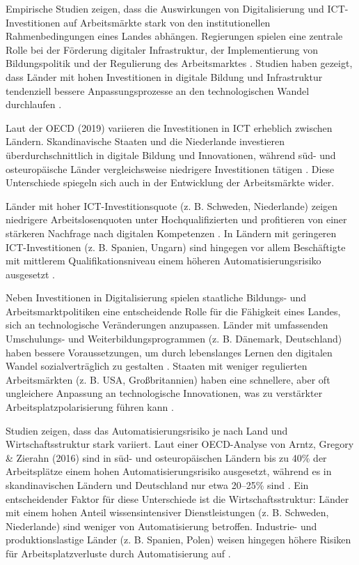 Empirische Studien zeigen, dass die Auswirkungen von Digitalisierung und 
\ac{ICT}-Investitionen auf Arbeitsmärkte stark von den institutionellen Rahmenbedingungen 
eines Landes abhängen. Regierungen spielen eine zentrale Rolle bei der Förderung 
digitaler Infrastruktur, der Implementierung von Bildungspolitik und der Regulierung des 
Arbeitsmarktes \parencite[vgl.][S. 1–5]{hall2001varieties}. Studien haben gezeigt, dass 
Länder mit hohen Investitionen in digitale Bildung und Infrastruktur tendenziell bessere 
Anpassungsprozesse an den technologischen Wandel durchlaufen 
\parencite[vgl.][S. 23]{oecd2020digital}.

Laut der \ac{OECD} (2019) variieren die Investitionen in \ac{ICT} erheblich zwischen 
Ländern. Skandinavische Staaten und die Niederlande investieren überdurchschnittlich in 
digitale Bildung und Innovationen, während süd- und osteuropäische Länder vergleichsweise 
niedrigere Investitionen tätigen \parencite[vgl.][S. 45]{oecd2020digital}. Diese 
Unterschiede spiegeln sich auch in der Entwicklung der Arbeitsmärkte wider.

Länder mit hoher \ac{ICT}-Investitionsquote (z. B. Schweden, Niederlande) zeigen 
niedrigere Arbeitslosenquoten unter Hochqualifizierten und profitieren von einer 
stärkeren Nachfrage nach digitalen Kompetenzen 
\parencite[vgl.][S. 78]{brynjolfsson2014thesecond}. In Ländern mit geringeren 
\ac{ICT}-Investitionen (z. B. Spanien, Ungarn) sind hingegen vor allem Beschäftigte mit 
mittlerem Qualifikationsniveau einem höheren Automatisierungsrisiko ausgesetzt 
\parencite[vgl.][S. 12]{frey2013thefuture}.

Neben Investitionen in Digitalisierung spielen staatliche Bildungs- und 
Arbeitsmarktpolitiken eine entscheidende Rolle für die Fähigkeit eines Landes, sich an 
technologische Veränderungen anzupassen. Länder mit umfassenden Umschulungs- und 
Weiterbildungsprogrammen (z. B. Dänemark, Deutschland) haben bessere Voraussetzungen, um 
durch lebenslanges Lernen den digitalen Wandel sozialverträglich zu gestalten 
\parencite[vgl.][S. 361]{vu2011ict}. Staaten mit weniger regulierten Arbeitsmärkten 
(z. B. USA, Großbritannien) haben eine schnellere, aber oft ungleichere Anpassung an 
technologische Innovationen, was zu verstärkter Arbeitsplatzpolarisierung führen kann 
\parencite[vgl.][S. 172]{goos2014explaining}.

Studien zeigen, dass das Automatisierungsrisiko je nach Land und Wirtschaftsstruktur stark 
variiert. Laut einer \ac{OECD}-Analyse von Arntz, Gregory \& Zierahn (2016) sind in süd- 
und osteuropäischen Ländern bis zu 40\% der Arbeitsplätze einem hohen 
Automatisierungsrisiko ausgesetzt, während es in skandinavischen Ländern und Deutschland 
nur etwa 20–25\% sind \parencite[vgl.][S. 12]{arntz2016therisk}. Ein entscheidender 
Faktor für diese Unterschiede ist die Wirtschaftsstruktur: Länder mit einem hohen Anteil 
wissensintensiver Dienstleistungen (z. B. Schweden, Niederlande) sind weniger von 
Automatisierung betroffen. Industrie- und produktionslastige Länder (z. B. Spanien, Polen) 
weisen hingegen höhere Risiken für Arbeitsplatzverluste durch Automatisierung auf 
\parencite[vgl.][S. 260]{frey2013thefuture}.

